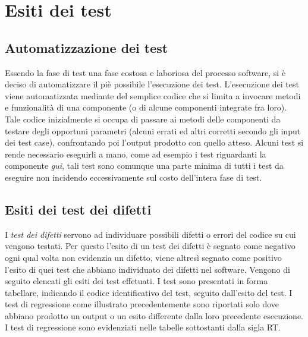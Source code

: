 \chapter{Esiti dei test}
\section{Automatizzazione dei test}
Essendo la fase di test una fase costosa e laboriosa del processo software, si \`e deciso di automatizzare il pi\`e possibile l'esecuzione dei test. L'esecuzione dei test viene automatizzata mediante del semplice codice che si limita a invocare metodi e funzionalit\`a di una componente (o di alcune componenti integrate fra loro). Tale codice inizialmente si occupa di passare ai metodi delle componenti da testare degli opportuni parametri (alcuni errati ed altri corretti secondo gli input dei test case), confrontando poi l'output prodotto con quello atteso.
Alcuni test si rende necessario eseguirli a mano, come ad esempio i test riguardanti la componente \textit{gui}, tali test sono comunque una parte minima di tutti i test da eseguire non incidendo eccessivamente sul costo dell'intera fase di test.
\section{Esiti dei test dei difetti}
I \textit{test dei difetti} servono ad individuare possibili difetti o errori del codice su cui vengono testati. Per questo l'esito di un test dei difetti \`e segnato come negativo ogni qual volta non evidenzia un difetto, viene altres\`i segnato come positivo l'esito di quei test che abbiano individuato dei difetti nel software.
Vengono di seguito elencati gli esiti dei test effetuati. I test  sono presentati in forma tabellare, indicando il codice identificativo del test, seguito dall'esito del test. I test di regressione come illustrato precedentemente sono riportati solo dove abbiano prodotto un output o un esito differente dalla loro precedente esecuzione. I test di regressione sono evidenziati nelle tabelle sottostanti dalla sigla RT.


